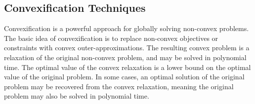 \documentclass[10pt]{article} %
\theoremstyle{plain}
\theoremstyle{definition}
\theoremstyle{remark}
\begin{document}
\subsection{Convexification Techniques}

Convexification is a powerful approach for globally solving non-convex problems. The basic idea of convexification is to replace non-convex objectives or constraints with convex outer-approximations. The resulting convex problem is a relaxation of the original non-convex problem, and may be solved in polynomial time. The optimal value of the convex relaxation is a lower bound on the optimal value of the original problem. In some cases, an optimal solution of the original problem may be recovered from the convex relaxation, meaning the original problem may also be solved in polynomial time.

\end{document}
